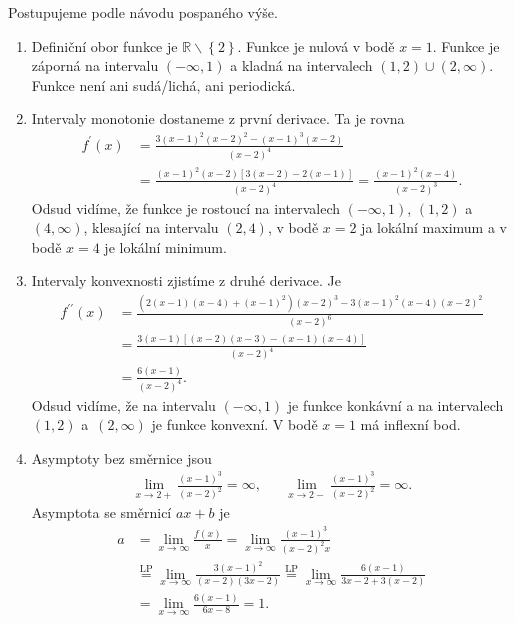 \begin{reseni}
Postupujeme podle návodu pospaného výše.
\begin{enumerate} [$i.$]
	\item Definiční obor funkce je $\mathbb R \smallsetminus \left \{ 2 \right \} $. Funkce je nulová v bodě
	$x=1$. Funkce je záporná na intervalu $\left (-\infty, 1 \right ) $ a kladná na intervalech
	$\left( 1,2 \right )\cup \left( 2,\infty \right )  $. Funkce není ani sudá/lichá, ani periodická.
	\item Intervaly monotonie dostaneme z první derivace. Ta je rovna
	\begin{align*}
  f^\prime(x) &= \frac{3(x-1)^2(x-2)^2 - (x-1)^3(x-2)}{(x-2)^4}\\
  &=\frac{(x-1)^2(x-2)\left [ 3(x-2)-2(x-1) \right ] }{(x-2)^4}= \frac{(x-1)^2(x-4)}{(x-2)^3}.
	\end{align*}
	Odsud vidíme, že funkce je rostoucí na intervalech $\left( -\infty, 1 \right ) $, $\left( 1, 2 \right ) $
	a $\left( 4,\infty \right ) $, klesající na intervalu $\left( 2,4 \right ) $, v bodě
	$x=2$ ja lokální maximum a v bodě $x=4$ je lokální minimum.
	\item Intervaly konvexnosti zjistíme z druhé derivace. Je
	\begin{align*}
		f^{\prime\prime}(x) &= \frac{\left( 2(x-1)(x-4) + (x-1)^2 \right )(x-2)^3-3(x-1)^2(x-4)(x-2)^2}{(x-2)^6}\\
		&= \frac{3(x-1)\left [ (x-2)(x-3) - (x-1)(x-4) \right ] }{(x-2)^4}\\
		&= \frac{6(x-1)}{(x-2)^4}.
	\end{align*}
	Odsud vidíme, že na intervalu $\left( -\infty, 1 \right ) $ je funkce konkávní a na intervalech
	$\left( 1,2 \right ) $ a~$\left( 2,\infty \right ) $ je funkce konvexní. V bodě $x=1$ má inflexní bod.
	\item Asymptoty bez směrnice jsou
	\begin{align*}
	 \lim_{x \to 2+} \frac{(x-1)^3}{(x-2)^2} = \infty, && \lim_{x \to 2-}\frac{(x-1)^3}{(x-2)^2} = \infty.
	\end{align*}
	Asymptota se směrnicí $ax+b$ je
	\begin{align*}
  a &= \lim_{x \to \infty} \frac{f(x)}{x} = \lim_{x \to \infty} \frac{(x-1)^3}{(x-2)^2x} \\
  & \stackrel{\text{LP}}{=} \lim_{x \to \infty} \frac{3(x-1)^2}{(x-2)(3x-2)} \stackrel{\text{LP}}{=} \lim_{x \to \infty} \frac{6(x-1)}{3x-2+3(x-2)} \\
  &= \lim_{x \to \infty} \frac{6(x-1)}{6x-8} = 1.

\end{align*}
\end{enumerate}
\end{reseni}

